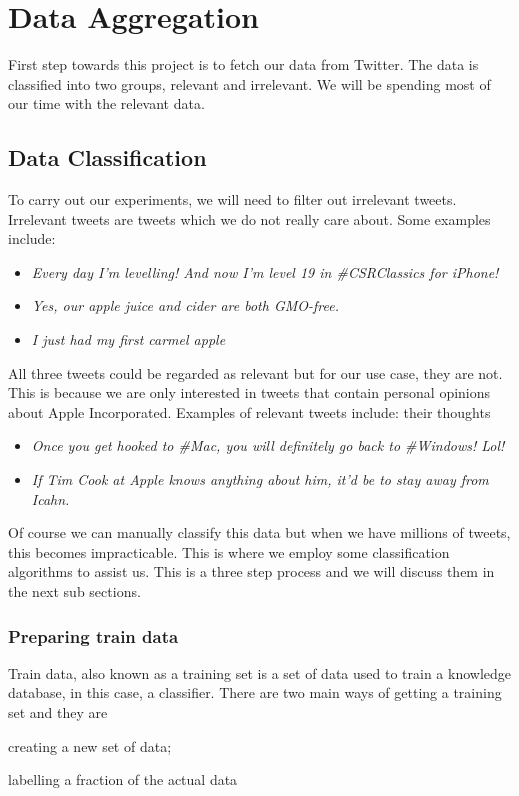 
\chapter{Data Aggregation}
First step towards this project is to fetch our data from Twitter. The data is classified into two
groups, relevant and irrelevant. We will be spending most of our time with the relevant data.


\section{Data Classification}
To carry out our experiments, we will need to filter out irrelevant tweets. Irrelevant tweets are
tweets which we do not really care about. Some examples include:

\begin{itemize}
  \item \textit{Every day I'm levelling! And now I'm level 19 in \#CSRClassics for iPhone!}
  \item \textit{Yes, our apple juice and cider are both GMO-free.}
  \item \textit{I just had my first carmel apple}
\end{itemize}

All three tweets could be regarded as relevant but for our use case, they are not. This is because
we are only interested in tweets that contain personal opinions about Apple Incorporated. Examples
of relevant tweets include: their thoughts
\begin{itemize}
  \item \textit{Once you get hooked to \#Mac, you will definitely go back to \#Windows! Lol!}
  \item \textit{If Tim Cook at Apple knows anything about him, it'd be to stay away from Icahn.}
\end{itemize}

Of course we can manually classify this data but when we have millions of tweets, this becomes
impracticable. This is where we employ some classification algorithms to assist us. This is a
three step process and we will discuss them in the next sub sections.

\subsection{Preparing train data}
Train data, also known as a training set is a set of data used to train a knowledge database, in
this case, a classifier. There are two main ways of getting a training set and they are
\begin{enumerate*} [label=\itshape\alph*\upshape)]
  \item creating a new set of data;
  \item labelling a fraction of the actual data
\end{enumerate*}

